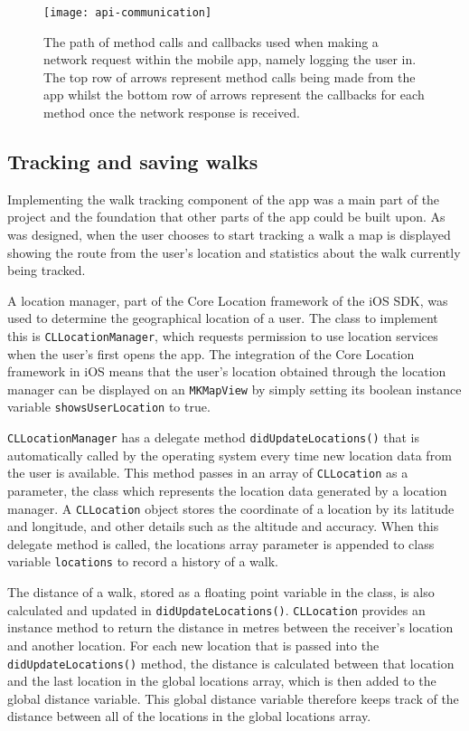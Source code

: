 \begin{figure}[hbt]
  \centering
  \texttt{[image: api-communication]}
  \caption{The path of method calls and callbacks used when making a network request within the mobile app, namely logging the user in. The top row of arrows represent method calls being made from the app whilst the bottom row of arrows represent the callbacks for each method once the network response is received.}
  \label{fig:api-communication}
\end{figure}

\subsection{Tracking and saving walks}

Implementing the walk tracking component of the app was a main part of the project and the foundation that other parts of the app could be built upon. As was designed, when the user chooses to start tracking a walk a map is displayed showing the route from the user's location and statistics about the walk currently being tracked.

A location manager, part of the Core Location framework of the iOS SDK, was used to determine the geographical location of a user. The class to implement this is \verb|CLLocationManager|, which requests permission to use location services when the user's first opens the app. The integration of the Core Location framework in iOS means that the user's location obtained through the location manager can be displayed on an \verb|MKMapView| by simply setting its boolean instance variable \verb|showsUserLocation| to true.

\verb|CLLocationManager| has a delegate method \verb|didUpdateLocations()| that is automatically called by the operating system every time new location data from the user is available. This method passes in an array of \verb|CLLocation| as a parameter, the class which represents the location data generated by a location manager. A \verb|CLLocation| object stores the coordinate of a location by its latitude and longitude, and other details such as the altitude and accuracy. When this delegate method is called, the locations array parameter is appended to class variable \verb|locations| to record a history of a walk.

The distance of a walk, stored as a floating point variable in the class, is also calculated and updated in \verb|didUpdateLocations()|. \verb|CLLocation| provides an instance method to return the distance in metres between the receiver's location and another location. For each new location that is passed into the \verb|didUpdateLocations()| method, the distance is calculated between that location and the last location in the global locations array, which is then added to the global distance variable. This global distance variable therefore keeps track of the distance between all of the locations in the global locations array.


